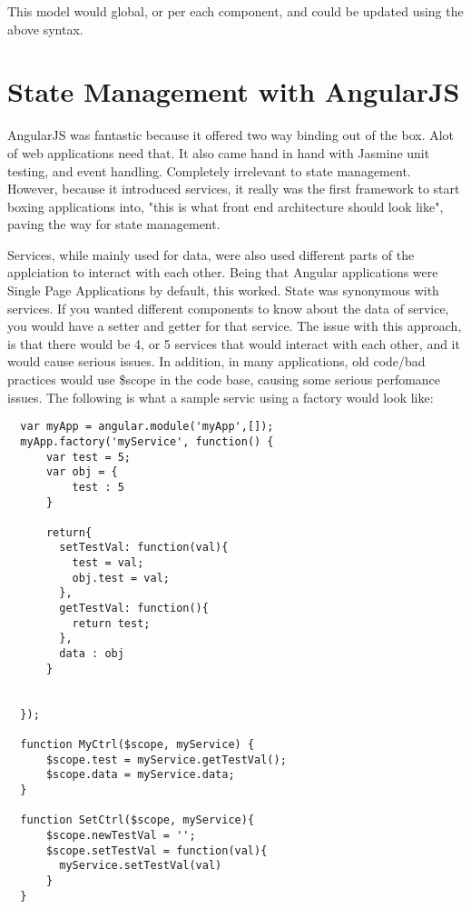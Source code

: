 This model would global, or per each component, and could be updated using the
above syntax.

\section{ State Management with AngularJS }
AngularJS was fantastic because it offered two way binding out of the box. Alot
of web applications need that. It also came hand in hand with Jasmine unit
testing, and event handling. Completely irrelevant to state management. However,
because it introduced services, it really was the first framework to start boxing
applications into, "this is what front end architecture should look like",
paving the way for state management.

Services, while mainly used for data, were also used different parts of the
applciation to interact with each other. Being that Angular applications were
Single Page Applications by default, this worked. State was synonymous with
services. If you wanted different components to know about the data of service,
you would have a setter and getter for that service. The issue with this
approach, is that there would be 4, or 5 services that would interact with each
other, and it would cause serious issues. In addition, in many applications, old
code/bad practices would use \$scope in the code base, causing some serious
perfomance issues. The following is what a sample servic using a factory would
look like:

\begin{lstlisting}
  var myApp = angular.module('myApp',[]);
  myApp.factory('myService', function() {
      var test = 5;
      var obj = {
          test : 5
      }

      return{
        setTestVal: function(val){
          test = val;
          obj.test = val;
        },
        getTestVal: function(){
          return test;
        },
        data : obj
      }


  });

  function MyCtrl($scope, myService) {
      $scope.test = myService.getTestVal();
      $scope.data = myService.data;
  }

  function SetCtrl($scope, myService){
      $scope.newTestVal = '';
      $scope.setTestVal = function(val){
        myService.setTestVal(val)
      }
  }
\end{lstlisting}


